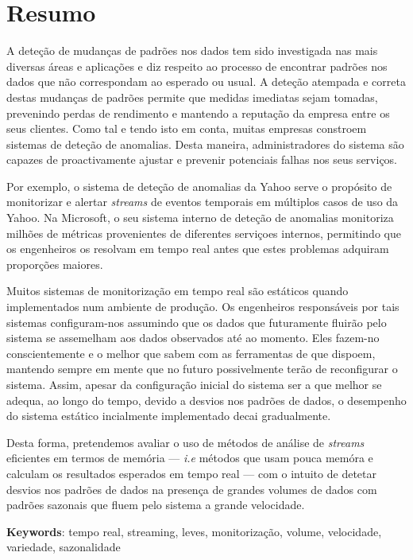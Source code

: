 \chapter*{Resumo}

A deteção de mudanças de padrões nos dados tem sido investigada nas mais diversas áreas e aplicações e diz respeito ao processo de encontrar padrões nos dados que não correspondam ao esperado ou usual. A deteção atempada e correta destas mudanças de padrões permite que medidas imediatas sejam tomadas, prevenindo perdas de rendimento e mantendo a reputação da empresa entre os seus clientes. Como tal e tendo isto em conta, muitas empresas constroem sistemas de deteção de anomalias. Desta maneira, administradores do sistema são capazes de proactivamente ajustar e prevenir potenciais falhas nos seus serviços.

Por exemplo, o sistema de deteção de anomalias da Yahoo serve o propósito de monitorizar e alertar \textit{streams} de eventos temporais em múltiplos casos de uso da Yahoo. Na Microsoft, o seu sistema interno de deteção de anomalias monitoriza milhões de métricas provenientes de diferentes serviçoes internos, permitindo que os engenheiros os resolvam em tempo real antes que estes problemas adquiram proporções maiores.

Muitos sistemas de monitorização em tempo real são estáticos quando implementados num ambiente de produção. Os engenheiros responsáveis por tais sistemas configuram-nos assumindo que os dados que futuramente fluirão pelo sistema se assemelham aos dados observados até ao momento. Eles fazem-no conscientemente e o melhor que sabem com as ferramentas de que dispoem, mantendo sempre em mente que no futuro possivelmente terão de reconfigurar o sistema. Assim, apesar da configuração inicial do sistema ser a que melhor se adequa, ao longo do tempo, devido a desvios nos padrões de dados, o desempenho do sistema estático incialmente implementado decai gradualmente.


Desta forma, pretendemos avaliar o uso de métodos de análise de \textit{streams} eficientes em termos de memória --- \textit{i.e} métodos que usam pouca memóra e calculam os resultados esperados em tempo real --- com o intuito de detetar desvios nos padrões de dados na presença de grandes volumes de dados com padrões sazonais que fluem pelo sistema a grande velocidade.

\vspace*{10mm}\noindent
\textbf{Keywords}: tempo real, streaming, leves, monitorização, volume, velocidade, variedade, sazonalidade